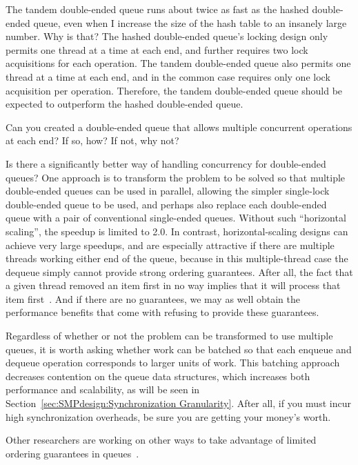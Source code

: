 \QuickQ{}
	The tandem double-ended queue runs about twice as fast as
	the hashed double-ended queue, even when I increase the
	size of the hash table to an insanely large number.
	Why is that?
\QuickA{}
	The hashed double-ended queue's locking design only permits
	one thread at a time at each end, and further requires
	two lock acquisitions for each operation.
	The tandem double-ended queue also permits one thread at a time
	at each end, and in the common case requires only one lock
	acquisition per operation.
	Therefore, the tandem double-ended queue should be expected to
	outperform the hashed double-ended queue.

	Can you created a double-ended queue that allows multiple
	concurrent operations at each end?
	If so, how?  If not, why not?

\QuickQ{}
	Is there a significantly better way of handling concurrency
	for double-ended queues?
\QuickA{}
	One approach is to transform the problem to be solved
	so that multiple double-ended queues can be used in parallel,
	allowing the simpler single-lock double-ended queue to be used,
	and perhaps also replace each double-ended queue with a pair of
	conventional single-ended queues.
	Without such ``horizontal scaling'', the speedup is limited
	to 2.0.
	In contrast, horizontal-scaling designs can achieve very large
	speedups, and are especially attractive if there are multiple threads
	working either end of the queue, because in this
	multiple-thread case the dequeue
	simply cannot provide strong ordering guarantees.
	After all, the fact that a given thread removed an item first
	in no way implies that it will process that item
	first~\cite{AndreasHaas2012FIFOisnt}.
	And if there are no guarantees, we may as well obtain the
	performance benefits that come with refusing to provide these
	guarantees.

	Regardless of whether or not the problem can be transformed
	to use multiple queues, it is worth asking whether work can
	be batched so that each enqueue and dequeue operation corresponds
	to larger units of work.
	This batching approach decreases contention on the queue data
	structures, which increases both performance and scalability,
	as will be seen in
	Section~\ref{sec:SMPdesign:Synchronization Granularity}.
	After all, if you must incur high synchronization overheads,
	be sure you are getting your money's worth.

	Other researchers are working on other ways to take advantage
	of limited ordering guarantees in
	queues~\cite{ChristophMKirsch2012FIFOisntTR}.

